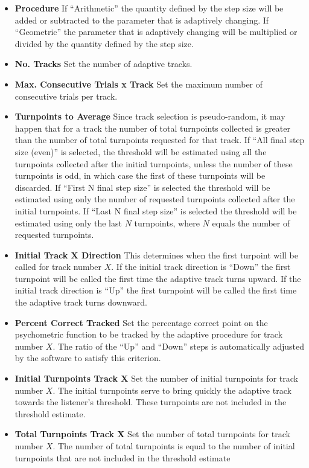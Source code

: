 \begin{itemize}
\item \textbf{Procedure} If ``Arithmetic'' the quantity defined by the step size will be added or subtracted to the parameter that is adaptively changing. 
  If ``Geometric'' the parameter that is adaptively changing will be multiplied or divided by the quantity defined by the step size.
\item \textbf{No. Tracks} Set the number of adaptive tracks.
\item \textbf{Max. Consecutive Trials x Track} Set the maximum number of consecutive trials per track. 
\item \textbf{Turnpoints to Average} Since track selection is pseudo-random, it may happen that for a track the number of total turnpoints collected is greater
  than the number of total turnpoints requested for that track. If ``All final step size (even)'' is selected, the threshold will be estimated using all
  the turnpoints collected after the initial turnpoints, unless the number of these turnpoints is odd, in which case the first of these turnpoints will be discarded.
  If ``First N final step size'' is selected the threshold will be estimated using only the number of requested turnpoints collected after the initial turnpoints.
  If ``Last N final step size'' is selected the threshold will be estimated using only the last $N$ turnpoints, where $N$ equals the number of requested turnpoints.
\item \textbf{Initial Track X Direction} This determines when the first turpoint will be called for track number $X$. If the initial track direction is ``Down'' the first turnpoint will be called
  the first time the adaptive track turns upward. If the initial track direction is ``Up'' the first turnpoint will be called
  the first time the adaptive track turns downward.
\item \textbf{Percent Correct Tracked} Set the percentage correct point on the psychometric function to be tracked by the adaptive procedure for track number $X$. The ratio of the ``Up'' and ``Down'' steps
  is automatically adjusted by the software to satisfy this criterion.
\item \textbf{Initial Turnpoints Track X} Set the number of initial turnpoints for track number $X$. The initial turnpoints serve to bring quickly the adaptive track towards the listener's threshold.
  These turnpoints are not included in the threshold estimate. 
\item \textbf{Total Turnpoints Track X} Set the number of total turnpoints for track number $X$. The number of total turnpoints is equal to the number of initial turnpoints that are not included in the threshold estimate

\end{itemize}
